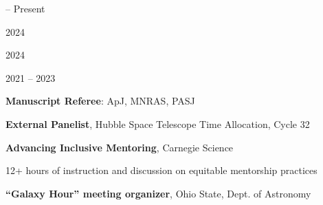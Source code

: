 \documentclass[cv.tex]{subfiles}
\begin{document}
\parbox{0.18\textwidth}{%
	 -- Present \par
	2024 \par
	2024 \par
	\null \par
	2021 -- 2023 \par
}
\hspace{1mm}
\parbox{0.8\textwidth}{%
	\vspace{1mm}
	\textbf{Manuscript Referee}: ApJ, MNRAS, PASJ \par
	\textbf{External Panelist}, Hubble Space Telescope Time Allocation,
	Cycle 32 \par
	\textbf{Advancing Inclusive Mentoring}, Carnegie Science \par
	12+ hours of instruction and discussion on equitable mentorship practices \par
	\textbf{``Galaxy Hour'' meeting organizer}, Ohio State, Dept. of Astronomy
	\par
}
\end{document}

